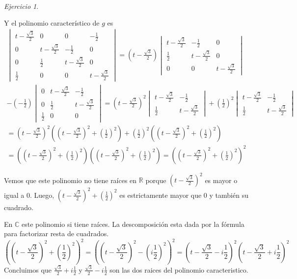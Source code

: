\documentclass[11pt,a4paper]{article}
\theoremstyle{definition}
\theoremstyle{remark}
\newtheorem{exc}{Ejercicio}
\begin{document}
\begin{exc}
\begin{enumerate}
		Y el polinomio característico de $ g $ es
		\begin{multline}
		\begin{vmatrix}
		t-\frac{\sqrt{3}}{2} & 0 & 0 & -\frac{1}{2}
			\\ 0 & t-\frac{\sqrt{3}}{2} & -\frac{1}{2} & 0 
			\\ 0 & \frac{1}{2} & t-\frac{\sqrt{3}}{2} & 0
			\\ \frac{1}{2} & 0 & 0 & t-\frac{\sqrt{3}}{2}
		\end{vmatrix}\nonumber = (t- \frac{\sqrt{3}}{2})
		\begin{vmatrix}
				 t-\frac{\sqrt{3}}{2} & -\frac{1}{2} & 0 
				\\\frac{1}{2} & t-\frac{\sqrt{3}}{2} & 0
				\\0 & 0 & t-\frac{\sqrt{3}}{2}
			\end{vmatrix} \\
			-(-\frac{1}{2})\begin{vmatrix}
				0 & t-\frac{\sqrt{3}}{2} & -\frac{1}{2}
					\\ 0 & \frac{1}{2} & t-\frac{\sqrt{3}}{2}
					\\ \frac{1}{2} & 0 & 0
				\end{vmatrix}\nonumber = (t-\frac{\sqrt{3}}{2})^2\begin{vmatrix}
							 t-\frac{\sqrt{3}}{2} & -\frac{1}{2}
							\\\frac{1}{2} & t-\frac{\sqrt{3}}{2}
						\end{vmatrix}+(\frac{1}{2})^2\begin{vmatrix}
									t-\frac{\sqrt{3}}{2} & -\frac{1}{2}
										\\ \frac{1}{2} & t-\frac{\sqrt{3}}{2}
									\end{vmatrix}
		\\=(t-\frac{\sqrt{3}}{2})^2((t-\frac{\sqrt{3}}{2})^2+(\frac{1}{2})^2)+(\frac{1}{2})^2((t-\frac{\sqrt{3}}{2})^2+(\frac{1}{2})^2)
		\\=((t-\frac{\sqrt{3}}{2})^2+(\frac{1}{2})^2)((t-\frac{\sqrt{3}}{2})^2+(\frac{1}{2})^2)=((t-\frac{\sqrt{3}}{2})^2+(\frac{1}{2})^2)^2
		\end{multline}
		
		Vemos que este polinomio no tiene raíces en $ \mathbb{R} $ porque $ (t-\frac{\sqrt{3}}{2})^2 $ es mayor o igual a 0. Luego, $ (t-\frac{\sqrt{3}}{2})^2 + (\frac{1}{2})^2$ es estrictamente mayor que 0 y también su cuadrado.
		
	    En $ \mathbb{C} $ este polinomio si tiene raíces. La descomposición esta dada por la fórmula para factorizar resta de cuadrados.
	    \begin{equation}
	    ((t-\frac{\sqrt{3}}{2})^2+(\frac{1}{2})^2)^2=((t-\frac{\sqrt{3}}{2})^2-(i\frac{1}{2})^2)^2=(t-\frac{\sqrt{3}}{2}-i\frac{1}{2})^2(t-\frac{\sqrt{3}}{2}+i\frac{1}{2})^2\nonumber
	    \end{equation}
	    Concluimos que $ \frac{\sqrt{3}}{2}+i\frac{1}{2} $ y $ \frac{\sqrt{3}}{2}-i\frac{1}{2} $ son las dos raices del polinomio caracteristico.
	    

\end{enumerate}
\end{exc}
\end{document}
